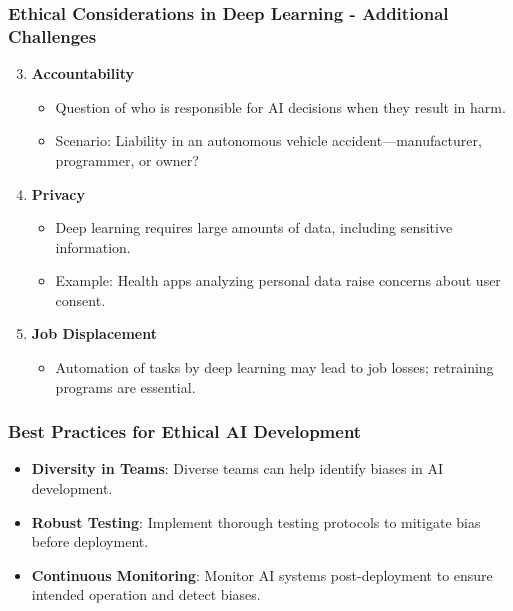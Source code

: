 \documentclass[aspectratio=169]{beamer}
\begin{document}
\begin{frame}[fragile]
    \frametitle{Ethical Considerations in Deep Learning - Additional Challenges}
    \begin{enumerate}
        \setcounter{enumi}{2}
        \item \textbf{Accountability}
        \begin{itemize}
            \item Question of who is responsible for AI decisions when they result in harm.
            \item Scenario: Liability in an autonomous vehicle accident—manufacturer, programmer, or owner?
        \end{itemize}
        \item \textbf{Privacy}
        \begin{itemize}
            \item Deep learning requires large amounts of data, including sensitive information.
            \item Example: Health apps analyzing personal data raise concerns about user consent.
        \end{itemize}
        \item \textbf{Job Displacement}
        \begin{itemize}
            \item Automation of tasks by deep learning may lead to job losses; retraining programs are essential.
        \end{itemize}
    \end{enumerate}
\end{frame}

\begin{frame}[fragile]
    \frametitle{Best Practices for Ethical AI Development}
    \begin{itemize}
        \item \textbf{Diversity in Teams}: Diverse teams can help identify biases in AI development.
        \item \textbf{Robust Testing}: Implement thorough testing protocols to mitigate bias before deployment.
        \item \textbf{Continuous Monitoring}: Monitor AI systems post-deployment to ensure intended operation and detect biases.
    \end{itemize}
\end{frame}
\end{document}
